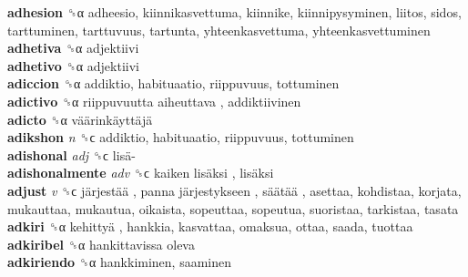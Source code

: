 \textbf{adhesion} ␝α  adheesio, kiinnikasvettuma, kiinnike, kiinnipysyminen, liitos, sidos, tarttuminen, tarttuvuus, tartunta, yhteenkasvettuma, yhteenkasvettuminen  \\
\textbf{adhetiva} ␝α  adjektiivi  \\
\textbf{adhetivo} ␝α  adjektiivi  \\
\textbf{adiccion} ␝α  addiktio, habituaatio, riippuvuus, tottuminen  \\
\textbf{adictivo} ␝α   riippuvuutta aiheuttava , addiktiivinen  \\
\textbf{adicto} ␝α   väärinkäyttäjä   \\
\textbf{adikshon} \emph{n}  ␝ϲ  addiktio, habituaatio, riippuvuus, tottuminen  \\
\textbf{adishonal} \emph{adj}  ␝ϲ   lisä-   \\
\textbf{adishonalmente} \emph{adv}  ␝ϲ   kaiken lisäksi ,  lisäksi   \\
\textbf{adjust} \emph{v}  ␝ϲ   järjestää ,  panna järjestykseen ,  säätää , asettaa, kohdistaa, korjata, mukauttaa, mukautua, oikaista, sopeuttaa, sopeutua, suoristaa, tarkistaa, tasata  \\
\textbf{adkiri} ␝α   kehittyä , hankkia, kasvattaa, omaksua, ottaa, saada, tuottaa  \\
\textbf{adkiribel} ␝α   hankittavissa oleva   \\
\textbf{adkiriendo} ␝α  hankkiminen, saaminen  \\
